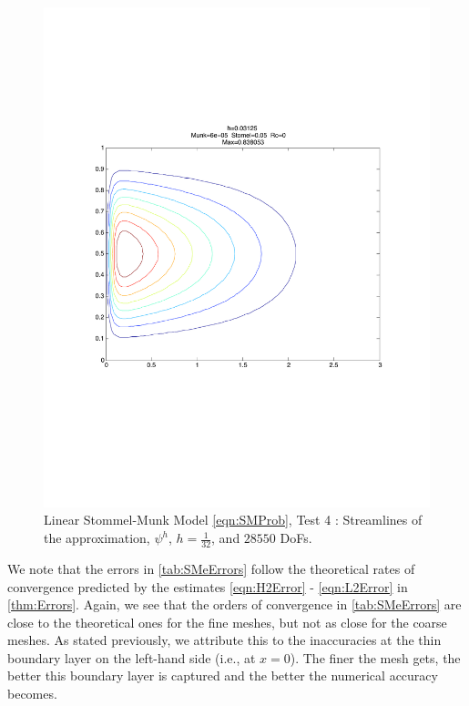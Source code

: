 \begin{figure}%
  \begin{center}
    \includegraphics[scale=0.5]{Figures/StommelMunk2.pdf}
    \caption{Linear Stommel-Munk Model \eqref{eqn:SMProb}, Test 4 \cite{Cascon}: Streamlines of the approximation,
    $\psi^h$, $h=\frac{1}{32}$, and $28550$ DoFs.}
    \label{fig:SMe}
  \end{center}
\end{figure}

We note that the errors in \autoref{tab:SMeErrors} follow the theoretical rates
of convergence predicted by the estimates \eqref{eqn:H2Error} -
\eqref{eqn:L2Error} in \autoref{thm:Errors}. Again, we see that the orders of
convergence in \autoref{tab:SMeErrors} are close to the theoretical ones for the
fine meshes, but not as close for the coarse meshes. As stated previously, we
attribute this to the inaccuracies at the thin boundary layer on the left-hand
side (i.e., at $x=0$). The finer the mesh gets, the better this boundary layer
is captured and the better the numerical accuracy becomes.

